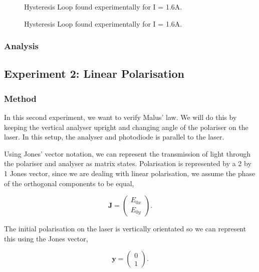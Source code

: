 \documentclass{article}
\begin{document}
\begin{figure} [H]
    \centering
    \scalebox{0.75}{}
    \label{fig:horizontaldettol}
    \caption{Hysteresis Loop found experimentally for I = 1.6A.}
\end{figure}

\begin{figure} [H]
    \centering
    \scalebox{0.75}{}
    \label{fig:verticaldettol}
    \caption{Hysteresis Loop found experimentally for I = 1.6A.}
\end{figure}

\subsubsection{Analysis}

\subsection{Experiment 2: Linear Polarisation}
\subsubsection{Method}
In this second experiment, we want to verify Malus' law. We will do 
this by keeping the vertical analyser upright and changing angle of 
the polariser on the laser. In this setup, the analyser and photodiode
is parallel to the laser.

Using Jones' vector notation, we can represent the transmission of 
light through the polariser and analyser as matrix states. Polarisation
is represented by a 2 by 1 Jones vector, since we are dealing with linear 
polarisation, we assume the phase of the orthogonal components to be equal,

\begin{equation}
    \textbf{J} = \begin{pmatrix}
        E_{0x} \\ 
        E_{0y}
    \end{pmatrix}.
\end{equation}

The initial polarisation on the laser is vertically orientated 
so we can represent this using the Jones vector,

\begin{equation}
    \textbf{y} = \begin{pmatrix}
        0 \\
        1
    \end{pmatrix}.
\end{equation}
\end{document}
